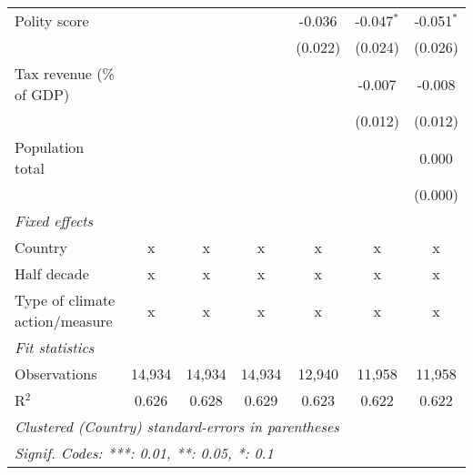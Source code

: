 \begin{tabular}{lcccccc}
   Polity score                                                       &         &              &              & -0.036        & -0.047$^{*}$  & -0.051$^{*}$\\   
                                                                      &         &              &              & (0.022)       & (0.024)       & (0.026)\\   
   Tax revenue (\% of GDP)                                            &         &              &              &               & -0.007        & -0.008\\   
                                                                      &         &              &              &               & (0.012)       & (0.012)\\   
   Population total                                                   &         &              &              &               &               & 0.000\\   
                                                                      &         &              &              &               &               & (0.000)\\   
   \emph{Fixed effects}\\
   Country                                                            & x       & x            & x            & x             & x             & x\\  
   Half decade                                                        & x       & x            & x            & x             & x             & x\\  
   Type of climate action/measure                                     & x       & x            & x            & x             & x             & x\\  
   \midrule \emph{Fit statistics}\\
   Observations                                                       & 14,934  & 14,934       & 14,934       & 12,940        & 11,958        & 11,958\\  
   R$^2$                                                              & 0.626   & 0.628        & 0.629        & 0.623         & 0.622         & 0.622\\  
   \midrule
   \multicolumn{7}{l}{\emph{Clustered (Country) standard-errors in parentheses}}\\
   \multicolumn{7}{l}{\emph{Signif. Codes: ***: 0.01, **: 0.05, *: 0.1}}\\
\end{tabular}
\par\endgroup


